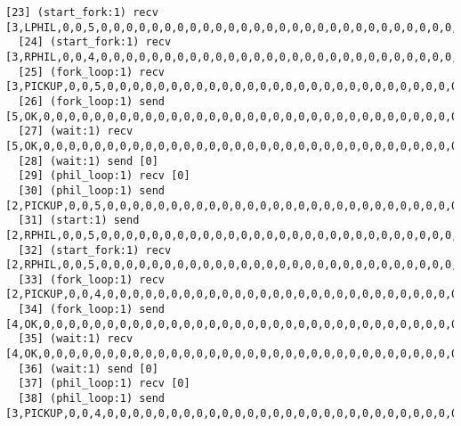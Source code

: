 \begin{lstlisting}[xleftmargin=.01\linewidth, xrightmargin=0.01\linewidth, caption={Dining Philosophers Verlixir Report.}, label={lst:dp_bug}]
  [23] (start_fork:1) recv [3,LPHIL,0,0,5,0,0,0,0,0,0,0,0,0,0,0,0,0,0,0,0,0,0,0,0,0,0,0,0,0,0,0,0,0,0,0,0,0,0,0,0,0,0,0]
  [24] (start_fork:1) recv [3,RPHIL,0,0,4,0,0,0,0,0,0,0,0,0,0,0,0,0,0,0,0,0,0,0,0,0,0,0,0,0,0,0,0,0,0,0,0,0,0,0,0,0,0,0]
  [25] (fork_loop:1) recv [3,PICKUP,0,0,5,0,0,0,0,0,0,0,0,0,0,0,0,0,0,0,0,0,0,0,0,0,0,0,0,0,0,0,0,0,0,0,0,0,0,0,0,0,0,0]
  [26] (fork_loop:1) send [5,OK,0,0,0,0,0,0,0,0,0,0,0,0,0,0,0,0,0,0,0,0,0,0,0,0,0,0,0,0,0,0,0,0,0,0,0,0,0,0,0,0,0,0]
  [27] (wait:1) recv [5,OK,0,0,0,0,0,0,0,0,0,0,0,0,0,0,0,0,0,0,0,0,0,0,0,0,0,0,0,0,0,0,0,0,0,0,0,0,0,0,0,0,0,0]
  [28] (wait:1) send [0]
  [29] (phil_loop:1) recv [0]
  [30] (phil_loop:1) send [2,PICKUP,0,0,5,0,0,0,0,0,0,0,0,0,0,0,0,0,0,0,0,0,0,0,0,0,0,0,0,0,0,0,0,0,0,0,0,0,0,0,0,0,0,0]
  [31] (start:1) send [2,RPHIL,0,0,5,0,0,0,0,0,0,0,0,0,0,0,0,0,0,0,0,0,0,0,0,0,0,0,0,0,0,0,0,0,0,0,0,0,0,0,0,0,0,0]
  [32] (start_fork:1) recv [2,RPHIL,0,0,5,0,0,0,0,0,0,0,0,0,0,0,0,0,0,0,0,0,0,0,0,0,0,0,0,0,0,0,0,0,0,0,0,0,0,0,0,0,0,0]
  [33] (fork_loop:1) recv [2,PICKUP,0,0,4,0,0,0,0,0,0,0,0,0,0,0,0,0,0,0,0,0,0,0,0,0,0,0,0,0,0,0,0,0,0,0,0,0,0,0,0,0,0,0]
  [34] (fork_loop:1) send [4,OK,0,0,0,0,0,0,0,0,0,0,0,0,0,0,0,0,0,0,0,0,0,0,0,0,0,0,0,0,0,0,0,0,0,0,0,0,0,0,0,0,0,0]
  [35] (wait:1) recv [4,OK,0,0,0,0,0,0,0,0,0,0,0,0,0,0,0,0,0,0,0,0,0,0,0,0,0,0,0,0,0,0,0,0,0,0,0,0,0,0,0,0,0,0]
  [36] (wait:1) send [0]
  [37] (phil_loop:1) recv [0]
  [38] (phil_loop:1) send [3,PICKUP,0,0,4,0,0,0,0,0,0,0,0,0,0,0,0,0,0,0,0,0,0,0,0,0,0,0,0,0,0,0,0,0,0,0,0,0,0,0,0,0,0,0]
  

\end{lstlisting}
